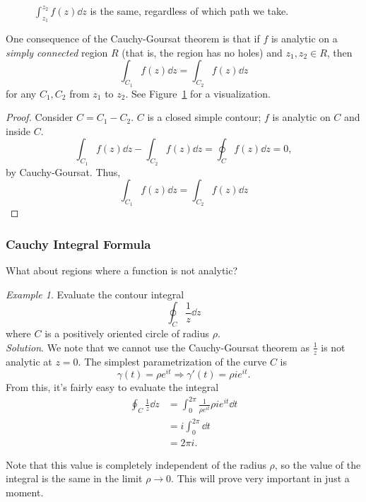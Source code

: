\documentclass[10pt]{scrartcl}
\numberwithin{equation}{subsection}
\theoremstyle{definition}
\theoremstyle{remark}
\newtheorem*{example}{Example}
\begin{document}
\begin{figure}
	\centering
	\caption{$\int_{z_1}^{z_2} f(z)\dd{z}$ is the same, regardless of which path
	we take.}
	\label{fig:pathind}
\end{figure}
One consequence of the Cauchy-Goursat theorem is that if $f$ is analytic
on a \textit{simply connected}  region $R$ (that is, the region has no holes)
and $z_1, z_2 \in R$, then 
\[
	\int_{C_1} f(z)\dd{z} = \int_{C_2} f(z)\dd{z}
\]
for any $C_1, C_2$ from $z_1$ to $z_2$. See Figure~\ref{fig:pathind} for a 
visualization.
\begin{proof}
	Consider $C=C_1 - C_2$. $C$ is a closed simple contour; $f$ is analytic 
	on $C$ and inside $C$.
	\[
		\int_{C_1} f(z)\dd{z} - \int_{C_2} f(z) \dd{z} = \oint_C f(z) \dd{z} = 0,
	\]
	by Cauchy-Goursat. Thus,	
	\[
		\int_{C_1} f(z)\dd{z} = \int_{C_2} f(z) \dd{z} 
	\]
\end{proof}
\subsubsection{Cauchy Integral Formula}
What about regions where a function is not analytic? 
\begin{example}
	Evaluate the contour integral
	\[
		\oint_C \frac{1}{z}\dd{z} 
	\]
	where $C$ is a positively oriented circle of radius $\rho$. \\
	\textit{Solution}.
	We note that we cannot use the Cauchy-Goursat theorem as $\frac{1}{z}$ is
	not analytic at $z=0$. The simplest parametrization of the curve $C$ is
	\[
	\gamma(t) = \rho e^{it} \Rightarrow \gamma'(t) = \rho i e^{it}.
	\]
	From this, it's fairly easy to evaluate the integral	
	\begin{align*}
		\oint_C \frac{1}{z}\dd{z} &= \int_0^{2\pi} \frac{1}{\rho e^{it}} \rho i e^{it} \dd{t}\\
								&= i \int_0^{2\pi} \dd{t}\\
								&= 2\pi i.
	\end{align*}
\end{example}
	Note that this value is completely independent of the radius $\rho$, so the
	value of the integral is the same in the limit $\rho \to 0$. This will 
	prove very important in just a moment. 
\end{document}

